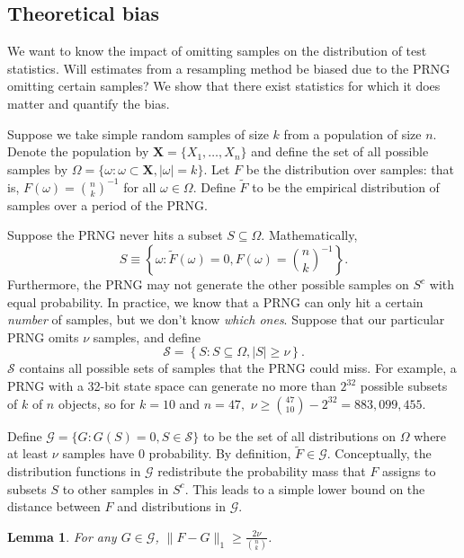 \documentclass[12pt]{article}
\newtheorem{lemma}[theorem]{Lemma}
\begin{document}
\subsection{Theoretical bias}

We want to know the impact of omitting samples on the distribution of test statistics.
Will estimates from a resampling method be biased due to the PRNG omitting certain samples?
We show that there exist statistics for which it does matter and quantify the bias.

Suppose we take simple random samples of size $k$ from a population of size $n$.
Denote the population by $\mathbf{X} = \{X_1, \dots, X_n\}$ and define the set of all possible samples by
$\Omega = \{\omega : \omega \subset \mathbf{X}, \lvert \omega \rvert = k \}$.
Let $F$ be the distribution over samples: that is, $F(\omega) = {n \choose k}^{-1}$ for all $\omega \in \Omega$.
Define $\tilde{F}$ to be the empirical distribution of samples over a period of the PRNG.

Suppose the PRNG never hits a subset $S \subseteq \Omega$.
Mathematically, 
$$S \equiv \left\lbrace \omega : \tilde{F}(\omega) = 0, F(\omega) = {n \choose k}^{-1}\right\rbrace.$$
Furthermore, the PRNG may not generate the other possible samples on $S^c$ with equal probability.
In practice, we know that a PRNG can only hit a certain \textit{number} of samples, but we don't know \textit{which ones}.
Suppose that our particular PRNG omits $\nu$ samples, and define
$$\mathcal{S} = \left\lbrace S : S \subseteq \Omega, \lvert S \rvert \geq \nu\right\rbrace.$$
$\mathcal{S}$ contains all possible sets of samples that the PRNG could miss.
For example, a PRNG with a 32-bit state space can generate no more than $2^{32}$ possible subsets of $k$ of $n$ objects, 
so for $k = 10$ and $n = 47,$ $\nu \geq { 47 \choose 10} - 2^{32} = 883,099,455$.

Define $\mathcal{G} = \{ G: G(S) = 0, S \in \mathcal{S}\}$ to be the set of all distributions on $\Omega$ where at least $\nu$ samples have 0 probability.
By definition, $\tilde{F} \in \mathcal{G}$.
Conceptually, the distribution functions in $\mathcal{G}$ redistribute the probability mass that $F$ assigns to subsets $S$ to other samples in $S^c$.
This leads to a simple lower bound on the distance between $F$ and distributions in $\mathcal{G}$.

\begin{lemma}\label{lemma:l1bound}
For any $G \in \mathcal{G}$, $ \lVert F - G \rVert_1 \geq \frac{2\nu}{{n \choose k}}$.
\end{lemma}
\end{document}
